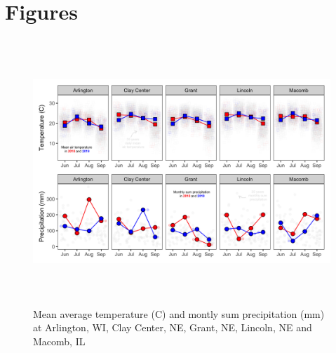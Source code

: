 \documentclass[utf8]{frontiersSCNS}
\begin{document}
\hypertarget{figures}{%
\section*{Figures}\label{figures}}

\begin{figure}

{\centering \includegraphics[width=160mm,height=100mm]{../data analysis/weather/Figure 1} 

}

\caption{Mean average temperature (C) and montly sum precipitation (mm) at Arlington, WI, Clay Center, NE, Grant, NE, Lincoln, NE and Macomb, IL}\label{fig:Figure-1}
\end{figure}
\end{document}
